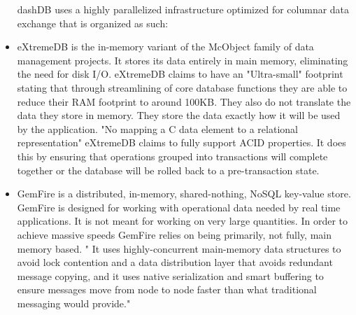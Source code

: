 \documentclass[letterpaper, 12pt]{article}
\renewcommand{\includegraphics}[2][]{\fbox{}}
\begin{document}
\begin{itemize}
	  dashDB uses a highly parallelized infrastructure optimized for columnar data
	  exchange that is organized as such:
	  \par\vspace{\baselineskip}
	  \cite{dashDB}
	  \par\vspace{\baselineskip}
	  \item eXtremeDB is the in-memory variant of the McObject family of data management
	  projects.
	  It stores its data entirely in main memory, eliminating the need for disk I/O. 
	  eXtremeDB claims to have an "Ultra-small" footprint stating that through 
	  streamlining of core database functions they are able to reduce their RAM footprint
	  to around 100KB. They also do not translate the data they store in memory. They 
	  store the data exactly how it will be used by the application. "No mapping a C data
	  element to a relational representation"\cite{extremeDB} eXtremeDB claims to fully 
	  support ACID properties. It does this by ensuring that operations grouped into
	  transactions will complete together or the database will be rolled back to a 
	  pre-transaction state.\cite{extremeDB}
	  \par\vspace{\baselineskip}
	  \cite{extremeDB}
	  \par\vspace{\baselineskip}
	  
	  \item GemFire is a distributed, in-memory, shared-nothing, NoSQL key-value store.
	  GemFire is designed for working with operational data needed by real time 
	  applications. It is not meant for working on very large quantities. In order to 
	  achieve massive speeds GemFire relies on being primarily, not fully, 
	  main memory based. " It uses highly-concurrent main-memory data structures to avoid
	  lock contention and a data distribution
	  layer that avoids redundant message copying, and it uses native serialization and
	  smart buffering to ensure messages move from node to node faster than what
	  traditional messaging would provide."\cite{gemfire}
	  \par\vspace{\baselineskip}
	  \par\vspace{\baselineskip}
	  

\end{itemize}
\end{document}
